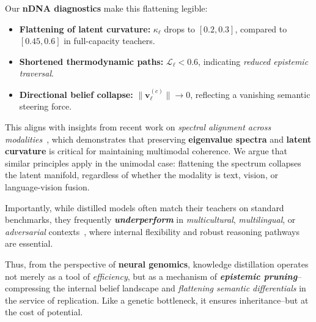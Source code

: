 \vspace{0.5em}
\noindent Our \textbf{nDNA diagnostics} make this flattening legible:
\begin{itemize}[leftmargin=1.5em]
    \item \textbf{Flattening of latent curvature:} $\kappa_\ell$ drops to $[0.2, 0.3]$, compared to $[0.45, 0.6]$ in full-capacity teachers.
    \item \textbf{Shortened thermodynamic paths:} $\mathcal{L}_\ell < 0.6$, indicating \emph{reduced epistemic traversal}.
    \item \textbf{Directional belief collapse:} $\| \mathbf{v}_\ell^{(c)} \| \to 0$, reflecting a vanishing semantic steering force.
\end{itemize}

\vspace{0.5em}
\noindent This aligns with insights from recent work on \emph{spectral alignment across modalities}~\citep{betley2025emergentmisalignmentnarrowfinetuning}, which demonstrates that preserving \textbf{eigenvalue spectra} and \textbf{latent curvature} is critical for maintaining multimodal coherence. We argue that similar principles apply in the unimodal case: flattening the spectrum collapses the latent manifold, regardless of whether the modality is text, vision, or language-vision fusion.

\vspace{0.5em}
\noindent Importantly, while distilled models often match their teachers on standard benchmarks, they frequently \textbf{\emph{underperform}} in \emph{multicultural}, \emph{multilingual}, or \emph{adversarial} contexts~\citep{zhao2023assessing, tao2023cultural, wang2023culturalbias}, where internal flexibility and robust reasoning pathways are essential.

\vspace{0.5em}
\noindent Thus, from the perspective of \textbf{neural genomics}, knowledge distillation operates not merely as a tool of \emph{efficiency}, but as a mechanism of \textbf{\emph{epistemic pruning}}--compressing the internal belief landscape and \emph{flattening semantic differentials} in the service of replication. Like a genetic bottleneck, it ensures inheritance--but at the cost of potential.

















